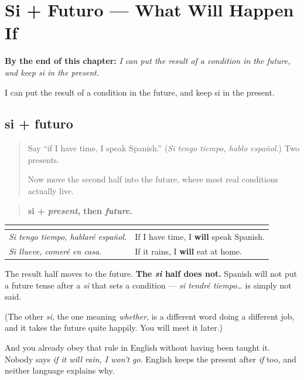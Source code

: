 
\chapter{Si + Futuro --- What Will Happen If}
\label{ch:si-futuro}

\begin{chapteropening}
\textbf{By the end of this chapter:} \emph{I can put the result of a condition in the future, and keep si in the present.}

I can put the result of a condition in the future, and keep si in the present.
\end{chapteropening}

\section[si + futuro]{si + futuro}

\label{lesson:ES-C55-si-futuro}



\begin{quote}
Say \textquotedblleft{}if I have time, I speak Spanish.\textquotedblright{} (\emph{Si tengo tiempo, hablo español}.) Two presents.

Now move the second half into the future, where most real conditions actually live.
\end{quote}

\begin{grammarlens}[title={Grammar Lens: the present stays put}]
\begin{quote}
\textbf{si + \emph{present}, then \emph{future}.}
\end{quote}

\noindent
\begin{tabularx}{\linewidth}{@{}>{\raggedright\arraybackslash}X>{\raggedright\arraybackslash}X@{}}
\toprule
\textbf{} & \textbf{} \\
\midrule
\emph{Si tengo tiempo, hablaré español.} & If I have time, I \textbf{will} speak Spanish. \\
\emph{Si llueve, comeré en casa.} & If it rains, I \textbf{will} eat at home. \\
\bottomrule
\end{tabularx}

The result half moves to the future. \textbf{The \emph{si} half does not.} Spanish will not put a future tense after a \emph{si} that sets a condition — \emph{si tendré tiempo…} is simply not said.

(The other \emph{si}, the one meaning \emph{whether}, is a different word doing a different job, and it takes the future quite happily. You will meet it later.)

And you already obey that rule in English without having been taught it. Nobody says \emph{if it will rain, I won't go}. English keeps the present after \emph{if} too, and neither language explains why.
\end{grammarlens}

